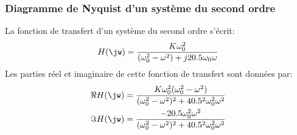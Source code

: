 \subsubsection{Diagramme de Nyquist d'un système du second ordre}
La fonction de transfert d'un système du second ordre s'écrit:
$$
H(\jw)=\dfrac{K\omega_0^2}{(\omega_0^2-\omega^2)+j2\xi\omega_0\omega}
$$
Les parties réel et imaginaire de cette fonction de transfert sont données par:
\begin{align*}
    \Re{H(\jw)}&=\dfrac{K\omega_0^2(\omega_0^2-\omega^2)}{(\omega_0^2-\omega^2)^2+4\xi^2\omega_0^2\omega^2}\\
    \Im{H(\jw)}&=\dfrac{-2\xi\omega_0^2\omega^2}{(\omega_0^2-\omega^2)^2+4\xi^2\omega_0^2\omega^2}\\
\end{align*}

